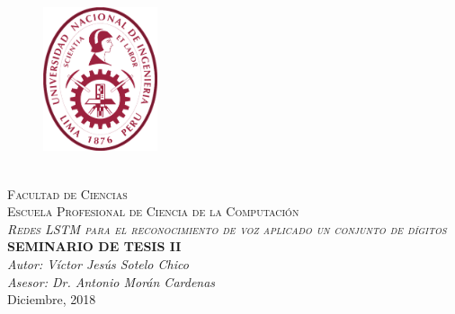 \documentclass[12pt,spanish, singlespacing,]{MastersDoctoralThesis}
\author{}
\newcommand\blankpage{%
    \null
    \thispagestyle{empty}%
    \addtocounter{page}{0}%
    \newpage}
\begin{document}
\frontmatter 
\pagestyle{plain} 
\begin{titlepage}
\begin{center}

\begin{figure}[h]
\centering
\includegraphics[width=0.3\textwidth]{Figures/log_uni.png}
\end{figure}

\textsc{\huge \univname}\\[0.3cm]
\textsc{\Large Facultad de Ciencias}\\[0.2cm]
\textsc{\large Escuela Profesional de Ciencia de la Computaci\'on}\\[2cm]
\textsc{\LARGE \textit{Redes LSTM para el reconocimiento de voz aplicado un conjunto de dígitos}}\\[2cm] 
{\Large \textbf{SEMINARIO DE TESIS II}}
{\huge \bfseries \ttitle}\\[2cm] 

\bigskip
\bigskip
\large\emph{Autor: Víctor Jesús Sotelo Chico}
{\authorname}\\ 
\large\emph{Asesor: Dr. Antonio Morán Cardenas}
{\supname} 
\\[1cm]
{\large Diciembre, 2018}\\[4cm] 
 
\vfill
\end{center}
\end{titlepage}
\afterpage{\blankpage}
\end{document}
